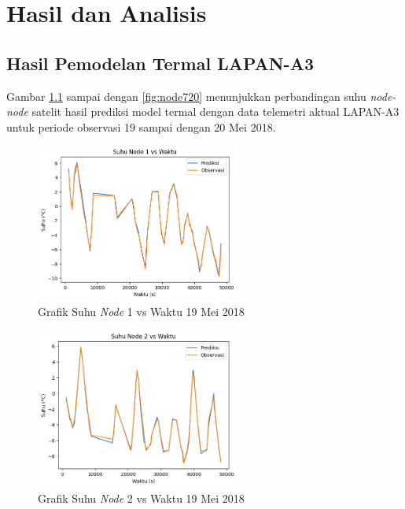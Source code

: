 \chapter{Hasil dan Analisis}

\section{Hasil Pemodelan Termal LAPAN-A3}

Gambar \ref{fig:node119} sampai dengan \ref{fig:node720} menunjukkan perbandingan suhu \textit{node-node} satelit
hasil prediksi model termal dengan data telemetri aktual LAPAN-A3 untuk periode observasi 19 sampai dengan 20 Mei 2018.

\begin{figure}[H]
\setlength{}
\begin{center}
\includegraphics[width=0.6\textwidth]{fig/node1_temp_2018-05-19.png}
	\caption{Grafik Suhu \textit{Node} 1 vs Waktu 19 Mei 2018}
\label{fig:node119}
\end{center}
\end{figure}

\begin{figure}[H]
\setlength{}
\begin{center}
\includegraphics[width=0.6\textwidth]{fig/node2_temp_2018-05-19.png}
	\caption{Grafik Suhu \textit{Node} 2 vs Waktu 19 Mei 2018}
\label{fig:node219}
\end{center}
\end{figure}

